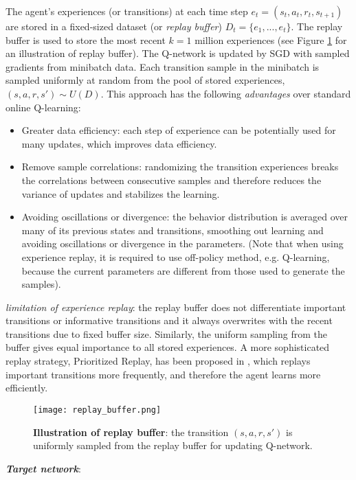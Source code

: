 \documentclass{article}
\begin{document}
The agent's experiences (or transitions) at each time step $e_t = (s_t, a_t, r_t, s_{t + 1})$ are stored in a fixed-sized dataset (or \textit{replay buffer}) $D_t = \{e_1, ..., e_t\}$. The replay buffer is used to store the most recent $k = 1$ million experiences (see Figure \ref{fig:replay} for an illustration of replay buffer). The Q-network is updated by SGD with sampled gradients from minibatch data. Each transition sample in the minibatch is sampled uniformly at random from the pool of stored experiences, $(s, a, r, s') \sim U(D)$. This approach has the following \textit{advantages} over standard online Q-learning:
\begin{itemize}
\item
Greater data efficiency: each step of experience can be potentially used for many updates, which improves data efficiency.
\item
Remove sample correlations: randomizing the transition experiences breaks the correlations between consecutive samples and therefore reduces the variance of updates and stabilizes the learning.
\item
Avoiding oscillations or divergence: the behavior distribution is averaged over many of its previous states and transitions, smoothing out learning and avoiding oscillations or divergence in the parameters. (Note that when using experience replay, it is required to use off-policy method, e.g. Q-learning, because the current parameters are different from those used to generate the samples).
\end{itemize}

\textit{limitation of experience replay}: the replay buffer does not differentiate important transitions or informative transitions and it always overwrites with the recent transitions due to fixed buffer size. Similarly, the uniform sampling from the buffer gives equal importance to all stored experiences. A more sophisticated replay strategy, Prioritized Replay, has been proposed in \cite{ref_p_replay}, which replays important transitions more frequently, and therefore the agent learns more efficiently.


\begin{figure}
    \centering
    \texttt{[image: replay\_buffer.png]}
     \caption{\textbf{Illustration of replay buffer}: the transition $(s, a, r, s')$ is uniformly sampled from the replay buffer for updating Q-network.}
     \label{fig:replay}
 \end{figure}


\textbf{\textit{Target network}}:
\end{document}
